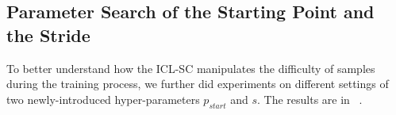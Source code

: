 \subsection{Parameter Search of the Starting Point and the Stride}

To better understand how the ICL-SC manipulates the difficulty of samples during the training process, we further did experiments on different settings of two newly-introduced hyper-parameters $p_{start}$ and $s$. The results are in ~.

\begin{figure}[th]
	\centering
	\begin{minipage}[t]{0.5\linewidth}
		\centering
	\end{minipage}%
	\begin{minipage}[t]{0.5\linewidth}
		\centering
\end{minipage}
\end{figure}

